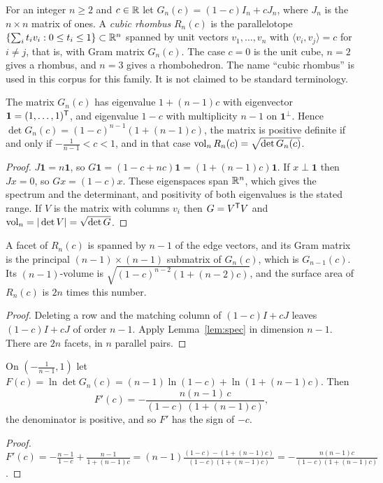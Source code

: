 \begin{definition}
For an integer $n\ge2$ and $c\in\mathbb{R}$ let $G_n(c)=(1-c)I_n+cJ_n$, where $J_n$ is the $n\times n$ matrix of ones.
A \emph{cubic rhombus} $R_n(c)$ is the parallelotope $\{\sum_i t_iv_i:0\le t_i\le1\}\subset\mathbb{R}^n$ spanned by unit vectors $v_1,\dots,v_n$ with $\langle v_i,v_j\rangle=c$ for $i\ne j$, that is, with Gram matrix $G_n(c)$.
The case $c=0$ is the unit cube, $n=2$ gives a rhombus, and $n=3$ gives a rhombohedron.
The name ``cubic rhombus'' is used in this corpus for this family. It is not claimed to be standard terminology.
\end{definition}

\begin{lemma}\label{lem:spec}
The matrix $G_n(c)$ has eigenvalue $1+(n-1)c$ with eigenvector $\mathbf 1=(1,\dots,1)^{\mathsf{T}}$, and eigenvalue $1-c$ with multiplicity $n-1$ on $\mathbf 1^{\perp}$.
Hence $\det G_n(c)=(1-c)^{n-1}(1+(n-1)c)$, the matrix is positive definite if and only if $-\tfrac1{n-1}<c<1$, and in that case $\operatorname{vol}_nR_n(c)=\sqrt{\det G_n(c)}$.
\end{lemma}
\begin{proof}
$J\mathbf 1=n\mathbf 1$, so $G\mathbf 1=(1-c+nc)\mathbf 1=(1+(n-1)c)\mathbf 1$.
If $x\perp\mathbf 1$ then $Jx=0$, so $Gx=(1-c)x$.
These eigenspaces span $\mathbb{R}^n$, which gives the spectrum and the determinant, and positivity of both eigenvalues is the stated range.
If $V$ is the matrix with columns $v_i$ then $G=V^{\mathsf{T}} V$ and $\operatorname{vol}_n=|\det V|=\sqrt{\det G}$.
\end{proof}

\begin{lemma}[Facets]\label{lem:facet}
A facet of $R_n(c)$ is spanned by $n-1$ of the edge vectors, and its Gram matrix is the principal $(n-1)\times(n-1)$ submatrix of $G_n(c)$, which is $G_{n-1}(c)$.
Its $(n-1)$-volume is $\sqrt{(1-c)^{n-2}(1+(n-2)c)}$, and the surface area of $R_n(c)$ is $2n$ times this number.
\end{lemma}
\begin{proof}
Deleting a row and the matching column of $(1-c)I+cJ$ leaves $(1-c)I+cJ$ of order $n-1$. Apply Lemma~\ref{lem:spec} in dimension $n-1$. There are $2n$ facets, in $n$ parallel pairs.
\end{proof}

\begin{lemma}\label{lem:dlog}
On $(-\tfrac1{n-1},1)$ let $F(c)=\ln\det G_n(c)=(n-1)\ln(1-c)+\ln(1+(n-1)c)$. Then
\[
F'(c)=-\frac{n(n-1)\,c}{(1-c)\,(1+(n-1)c)},
\]
the denominator is positive, and so $F'$ has the sign of $-c$.
\end{lemma}
\begin{proof}
$F'(c)=-\frac{n-1}{1-c}+\frac{n-1}{1+(n-1)c}=(n-1)\frac{(1-c)-(1+(n-1)c)}{(1-c)(1+(n-1)c)}=-\frac{n(n-1)c}{(1-c)(1+(n-1)c)}$.
\end{proof}

